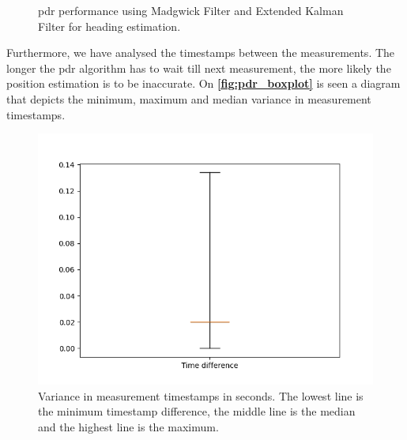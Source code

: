 \begin{figure}[H]
  \hfill
  \caption{\gls{pdr} performance using Madgwick Filter and Extended Kalman Filter for heading estimation.}
  \label{fig:pdr_performance}
\end{figure}

Furthermore, we have analysed the timestamps between the measurements. The longer the \gls{pdr} algorithm has to wait till next measurement, the more likely the position estimation is to be inaccurate. On \textbf{\autoref{fig:pdr_boxplot}} is seen a diagram that depicts the minimum, maximum and median variance in measurement timestamps.

\begin{figure}[H]
    \centering
    \includegraphics[scale = 0.55]{Images/Experiments/pdr/boxplot.png}
    \caption{Variance in measurement timestamps in seconds. The lowest line is the minimum timestamp difference, the middle line is the median and the highest line is the maximum.}
    \label{fig:pdr_boxplot}
\end{figure}

